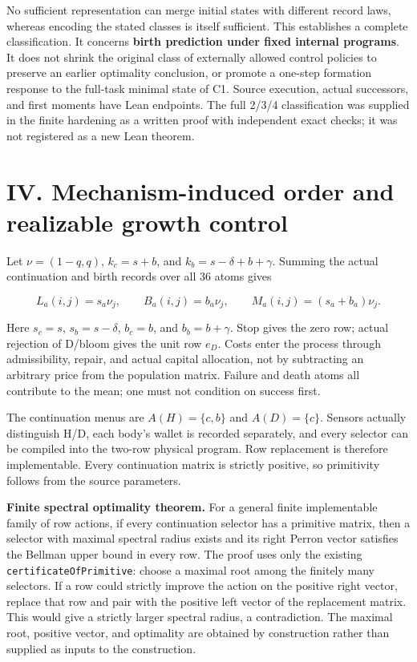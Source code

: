 \documentclass[
  english,
  11pt,
  oneside]{book}
\begin{document}
No sufficient representation can merge initial states with different record laws, whereas encoding the stated classes is itself sufficient. This establishes a complete classification. It concerns \textbf{birth prediction under fixed internal programs}. It does not shrink the original class of externally allowed control policies to preserve an earlier optimality conclusion, or promote a one-step formation response to the full-task minimal state of C1. Source execution, actual successors, and first moments have Lean endpoints. The full 2/3/4 classification was supplied in the finite hardening as a written proof with independent exact checks; it was not registered as a new Lean theorem.

\section{IV. Mechanism-induced order and realizable growth control}\label{iv.-mechanism-induced-order-and-realizable-growth-control}

Let \(\nu=(1-q,q)\), \(k_c=s+b\), and \(k_b=s-\delta+b+\gamma\). Summing the actual continuation and birth records over all 36 atoms gives

\[L_a(i,j)=s_a\nu_j,\qquad B_a(i,j)=b_a\nu_j,\qquad
M_a(i,j)=(s_a+b_a)\nu_j.\]

Here \(s_c=s\), \(s_b=s-\delta\), \(b_c=b\), and \(b_b=b+\gamma\). Stop gives the zero row; actual rejection of D/bloom gives the unit row \(e_D\). Costs enter the process through admissibility, repair, and actual capital allocation, not by subtracting an arbitrary price from the population matrix. Failure and death atoms all contribute to the mean; one must not condition on success first.

The continuation menus are \(A(H)=\{c,b\}\) and \(A(D)=\{c\}\). Sensors actually distinguish H/D, each body's wallet is recorded separately, and every selector can be compiled into the two-row physical program. Row replacement is therefore implementable. Every continuation matrix is strictly positive, so primitivity follows from the source parameters.

\textbf{Finite spectral optimality theorem.} For a general finite implementable family of row actions, if every continuation selector has a primitive matrix, then a selector with maximal spectral radius exists and its right Perron vector satisfies the Bellman upper bound in every row. The proof uses only the existing \nolinkurl{certificateOfPrimitive}: choose a maximal root among the finitely many selectors. If a row could strictly improve the action on the positive right vector, replace that row and pair with the positive left vector of the replacement matrix. This would give a strictly larger spectral radius, a contradiction. The maximal root, positive vector, and optimality are obtained by construction rather than supplied as inputs to the construction.
\end{document}
